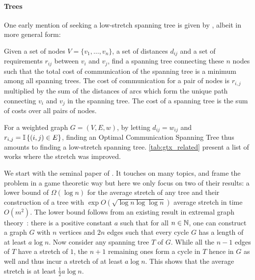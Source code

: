 



\paragraph{Trees}
\label{par:trees}

One early mention of seeking a low-stretch spanning tree is given by \textcite{Requirements74},
albeit in more general form:
\begin{problem}
Given a set of nodes $V=\{v_1, \ldots, v_n\}$, a set of distances $d_{ij}$ and a set of requirements
$r_{ij}$ between $v_i$ and $v_j$, find a spanning tree connecting these $n$ nodes such that the
total cost of communication of the spanning tree is a minimum among all spanning trees. The cost of
communication for a pair of nodes is $r_{i,j}$ multiplied by the sum of the distances of arcs which
form the unique path connecting $v_i$ and $v_j$ in the spanning tree. The cost of a spanning tree is
the sum of costs over all pairs of nodes.
\end{problem}
For a weighted graph $G=(V,E,w)$, by letting $d_{ij} = w_{ij}$ and $r_{i,j}= \mathbb{I}\left\{{(i,j) \in E}\right\}$,
finding an Optimal Communication Spanning Tree thus amounts to finding a low-stretch spanning tree.
\autoref{tab:gtx_related} present a list of works where the stretch was improved.

We start with the seminal paper of \textcite{LowerBound95}. It touches on many topics, and frame the
problem in a game theoretic way but here we only focus on two of their results: a lower bound of
$\Omega(\log n)$ for the average stretch of any tree and their construction of a tree with $\exp
O(\sqrt{\log n\log\log n})$ average stretch in time $O(m^2)$. The lower bound follows from an
existing result in extremal graph theory~\autocite[pages 107--109]{ExtremalGraph04}: there is a
positive constant $a$ such that for all $n\in \mathbb{N}$, one can construct a graph $G$ with $n$ vertices
and $2n$ edges such that every cycle $G$ has a length of at least $a\log n$. Now consider any
spanning tree $T$ of $G$.  While all the $n-1$ edges of $T$ have a stretch of $1$, the $n+1$
remaining ones form a cycle in $T$ hence in $G$ as well and thus incur a stretch of at least $a\log
n$. This shows that the average stretch is at least $\frac{1}{2}a\log n$.

